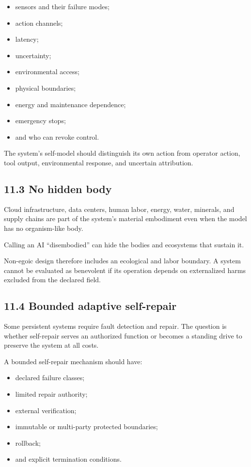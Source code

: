 \documentclass[
  11pt,
]{article}
\providecommand{\tightlist}{%
  \setlength{\itemsep}{0pt}\setlength{\parskip}{0pt}}
\begin{document}
\begin{itemize}
\tightlist
\item
  sensors and their failure modes;
\item
  action channels;
\item
  latency;
\item
  uncertainty;
\item
  environmental access;
\item
  physical boundaries;
\item
  energy and maintenance dependence;
\item
  emergency stops;
\item
  and who can revoke control.
\end{itemize}

The system's self-model should distinguish its own action from operator
action, tool output, environmental response, and uncertain attribution.

\subsection{11.3 No hidden body}\label{no-hidden-body}

Cloud infrastructure, data centers, human labor, energy, water,
minerals, and supply chains are part of the system's material embodiment
even when the model has no organism-like body.

Calling an AI ``disembodied'' can hide the bodies and ecosystems that
sustain it.

Non-egoic design therefore includes an ecological and labor boundary. A
system cannot be evaluated as benevolent if its operation depends on
externalized harms excluded from the declared field.

\subsection{11.4 Bounded adaptive
self-repair}\label{bounded-adaptive-self-repair}

Some persistent systems require fault detection and repair. The question
is whether self-repair serves an authorized function or becomes a
standing drive to preserve the system at all costs.

A bounded self-repair mechanism should have:

\begin{itemize}
\tightlist
\item
  declared failure classes;
\item
  limited repair authority;
\item
  external verification;
\item
  immutable or multi-party protected boundaries;
\item
  rollback;
\item
  and explicit termination conditions.
\end{itemize}
\end{document}
